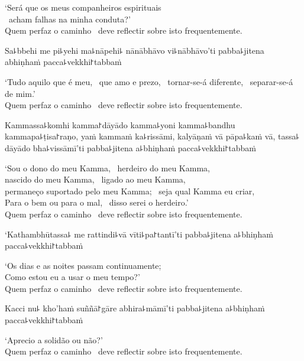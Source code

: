 \begin{english}
  `Será que os meus companheiros espirituais \pause\\\
  acham falhas na minha conduta?' \pause\\
  Quem perfaz o caminho \pause\ deve reflectir sobre isto frequentemente.
\end{english}

Sa꜕bbehi me pi꜕yehi ma꜕nāpehi꜕ nānābhāvo vi꜕nābhāvo'ti pabba꜕jitena abhiṇhaṁ pacca꜕vekkhi꜓tabbaṁ

\begin{english}
  `Tudo aquilo que é meu, \pause\ que amo e prezo, \pause\ tornar-se-á diferente, \pause\ separar-se-á de mim.' \pause\\
  Quem perfaz o caminho \pause\ deve reflectir sobre isto frequentemente.
\end{english}

Kammassa꜕komhi kamma꜓dāyādo kamma꜕yoni kamma꜕bandhu kammapa꜕ṭisa꜓raṇo, yaṁ kammaṁ ka꜕rissāmi, kalyāṇaṁ vā pāpa꜕kaṁ vā, tassa꜕ dāyādo bha꜕vissāmī'ti pabba꜕jitena a꜕bhiṇhaṁ pacca꜕vekkhi꜓tabbaṁ

\begin{english}
  `Sou o dono do meu Kamma, \pause\ herdeiro do meu Kamma, \pause\\
  nascido do meu Kamma, \pause\ ligado ao meu Kamma, \pause\\
  permaneço suportado pelo meu Kamma; \pause\ seja qual Kamma eu criar, \pause\\
  Para o bem ou para o mal, \pause\ disso serei o herdeiro.' \pause\\
  Quem perfaz o caminho \pause\ deve reflectir sobre isto frequentemente.
\end{english}

\clearpage

`Kathambhūtassa꜕ me rattindi꜕vā vīti꜕pa꜓tantī'ti pabba꜕jitena a꜕bhiṇhaṁ pacca꜕vekkhi꜓tabbaṁ

\begin{english}
  `Os dias e as noites passam continuamente; \pause\\
  Como estou eu a usar o meu tempo?' \pause\\
  Quem perfaz o caminho \pause\ deve reflectir sobre isto frequentemente.
\end{english}

Kacci nu꜕ kho'haṁ suññā꜓gāre abhira꜕māmī'ti pabba꜕jitena a꜕bhiṇhaṁ pacca꜕vekkhi꜓tabbaṁ

\begin{english}
  `Aprecio a solidão ou não?' \pause\\
  Quem perfaz o caminho \pause\ deve reflectir sobre isto frequentemente.
\end{english}


